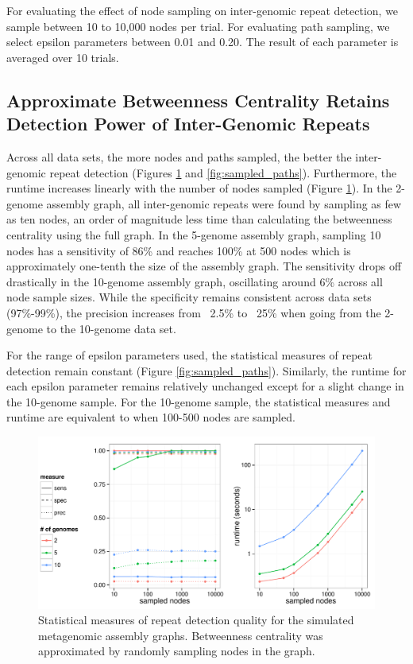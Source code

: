 \documentclass[runningheads,a4paper]{llncs}
\begin{document}
For evaluating the effect of node sampling on inter-genomic repeat detection, we sample between 10 to 10,000 nodes per trial.
For evaluating path sampling, we select epsilon parameters between 0.01 and 0.20.
The result of each parameter is averaged over 10 trials.

\subsection*{Approximate Betweenness Centrality Retains Detection Power of Inter-Genomic Repeats}

Across all data sets, the more nodes and paths sampled, the better the inter-genomic repeat detection (Figures \ref{fig:sampled_nodes} and \ref{fig:sampled_paths}).
Furthermore, the runtime increases linearly with the number of nodes sampled (Figure \ref{fig:sampled_nodes}).
In the 2-genome assembly graph, all inter-genomic repeats were found by sampling as few as ten nodes, an order of magnitude less time than calculating the betweenness centrality using the full graph.
In the 5-genome assembly graph, sampling 10 nodes has a sensitivity of 86\% and reaches 100\% at 500 nodes which is approximately one-tenth the size of the assembly graph.
The sensitivity drops off drastically in the 10-genome assembly graph, oscillating around 6\% across all node sample sizes.
While the specificity remains consistent across data sets (97\%-99\%), the precision increases from ~2.5\% to ~25\% when going from the 2-genome to the 10-genome data set.

For the range of epsilon parameters used, the statistical measures of repeat detection remain constant (Figure \ref{fig:sampled_paths}).
Similarly, the runtime for each epsilon parameter remains relatively unchanged except for a slight change in the 10-genome sample.
For the 10-genome sample, the statistical measures and runtime are equivalent to when 100-500 nodes are sampled.

\begin{figure}[htbp]
\centering
\includegraphics[width = \textwidth]{sampled_nodes}
\caption{Statistical measures of repeat detection quality for the simulated metagenomic assembly graphs. Betweenness centrality was approximated by randomly sampling nodes in the graph.}
\label{fig:sampled_nodes}
\end{figure}
\end{document}
